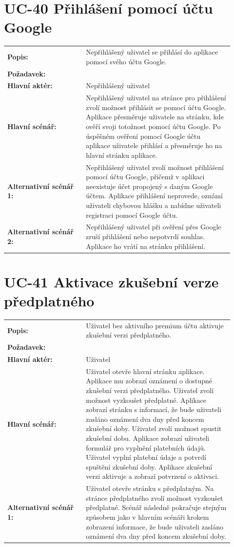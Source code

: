 \section{UC-40 Přihlášení pomocí účtu Google}\label{sec:uc-40}

\begin{tabular}{p{0.32\linewidth}p{0.6\linewidth}}
  \textbf{Popis:} & Nepřihlášený uživatel se přihlásí do aplikace pomocí svého účtu Google. \\
  \textbf{Požadavek:} & \nameref{sec:fp-google-auth} \\
  \textbf{Hlavní aktér:} & Nepřihlášený uživatel \\
  \textbf{Hlavní scénář:} & Nepřihlášený uživatel na stránce pro přihlášení zvolí možnost přihlásit se pomocí účtu Google. Aplikace přesměruje uživatele na stránku, kde ověří svoji totožnost pomocí účtu Google. Po úspěšném ověření pomocí Google účtu aplikace uživatele přihlásí a přesměruje ho na hlavní stránku aplikace. \\
  \textbf{Alternativní scénář 1:} & Nepřihlášený uživatel zvolí možnost přihlášení pomocí účtu Google, přičemž v aplikaci neexistuje účet propojený s daným Google účtem. Aplikace přihlášení neprovede, oznámí uživateli chybovou hlášku a nabídne uživateli registraci pomocí Google účtu. \\
  \textbf{Alternativní scénář 2:} & Nepřihlášený uživatel při ověření přes Google zruší přihlášení nebo nepotvrdí souhlas. Aplikace ho vrátí na stránku přihlášení. \\
\end{tabular}

\section{UC-41 Aktivace zkušební verze předplatného}\label{sec:uc-41}

\begin{tabular}{p{0.32\linewidth}p{0.6\linewidth}}
  \textbf{Popis:} & Uživatel bez aktivního premium účtu aktivuje zkušební verzi předplatného. \\
  \textbf{Požadavek:} & \nameref{sec:fp-free-trial} \\
  \textbf{Hlavní aktér:} & Uživatel \\
  \textbf{Hlavní scénář:} & Uživatel otevře hlavní stránku aplikace. Aplikace mu zobrazí oznámení o dostupné zkušební verzi předplatného. Uživatel zvolí možnost vyzkoušet předplatné. Aplikace zobrazí stránku s informací, že bude uživateli zasláno oznámení dva dny před koncem zkušební doby. Uživatel zvolí možnost spustit zkušební dobu. Aplikace zobrazí uživateli formulář pro vyplnění platebních údajů. Uživatel vyplní platební údaje a potvrdí spuštění zkušební doby. Aplikace zkušební verzi aktivuje a zobrazí potvrzení o aktivaci. \\
  \textbf{Alternativní scénář 1:} & Uživatel otevře stránku s předplatným. Na stránce předplatného zvolí možnost vyzkoušet předplatné. Scénář následně pokračuje stejným způsobem jako v hlavním scénáři krokem zobrazení informace, že bude uživateli zasláno oznámení dva dny před koncem zkušební doby.  \\
\end{tabular}

